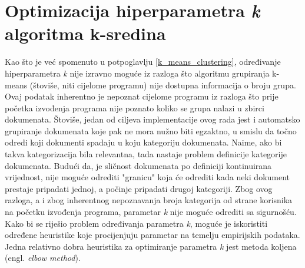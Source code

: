 \documentclass[times, utf8, zavrsni]{fer}
\begin{document}
\section{Optimizacija hiperparametra \textit{k} algoritma k-sredina}
\label{kmeans_optimization}
Kao što je već spomenuto u potpoglavlju \ref{k_means_clustering}, određivanje hiperparametra \textit{k} nije izravno moguće iz razloga što algoritmu grupiranja k-means (štoviše, niti cijelome programu) nije dostupna informacija o broju grupa. Ovaj podatak inherentno je nepoznat cijelome programu iz razloga što prije početka izvođenja programa nije poznato koliko se grupa nalazi u zbirci dokumenata. Štoviše, jedan od ciljeva implementacije ovog rada jest i automatsko grupiranje dokumenata koje pak ne mora nužno biti egzaktno, u smislu da točno odredi koji dokumenti spadaju u koju kategoriju dokumenata. Naime, ako bi takva kategorizacija bila relevantna, tada nastaje problem definicije kategorije dokumenata. Budući da, je sličnost dokumenata po definiciji kontinuirana vrijednost, nije moguće odrediti "granicu" koja će odrediti kada neki dokument prestaje pripadati jednoj, a počinje pripadati drugoj kategoriji. Zbog ovog razloga, a i zbog inherentnog nepoznavanja broja kategorija od strane korisnika na početku izvođenja programa, parametar \textit{k} nije moguće odrediti sa sigurnošću.
Kako bi se riješio problem određivanja parametra \textit{k}, moguće je iskoristiti određene heuristike koje procijenjuju parametar na temelju empirijskih podataka. Jedna relativno dobra heuristika za optimiranje parametra \textit{k} jest metoda koljena (engl. \textit{elbow method}).
\end{document}
